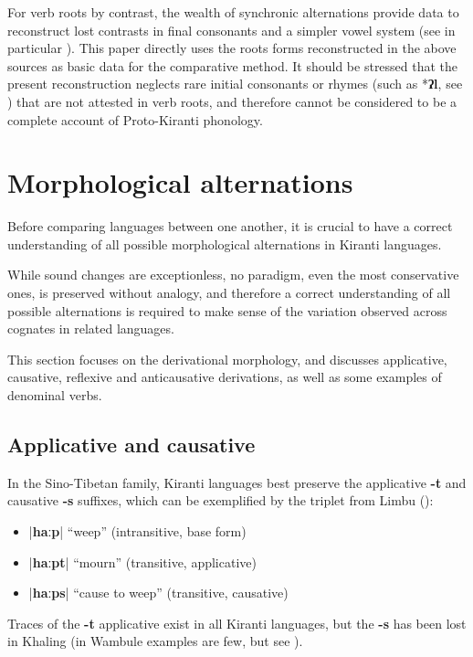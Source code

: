 \documentclass[oldfontcommands,oneside,a4paper,11pt]{article}
\newcommand{\ipa}[1]{\textbf{{\phon\mbox{#1}}}} %
\newcommand{\dhatu}[2]{|\ipa{#1}| ``#2''}
\begin{document}
For verb roots by contrast, the wealth of synchronic alternations provide data to reconstruct lost contrasts in final consonants and a simpler vowel system (see in particular \citealt{michailovsky02dico, jacques12khaling, michailovsky12dumi}). This paper directly uses the roots forms reconstructed in the above sources as basic data for the comparative method. It should be stressed that the present reconstruction neglects rare initial consonants or rhymes (such as *\ipa{ʔl}, see \citealt{opgenort04implosives}) that are not attested in verb roots, and therefore cannot be considered to be a complete account of Proto-Kiranti phonology.


\section{Morphological alternations} \label{sec:alternations}
Before comparing languages between one another, it is crucial to have a correct understanding of all possible morphological alternations in Kiranti languages. 

While sound changes are exceptionless, no paradigm, even the most conservative ones, is preserved without analogy, and therefore a correct understanding of all possible alternations is required to make sense of the variation observed across cognates in related languages.

This section focuses on the derivational morphology, and discusses applicative, causative, reflexive and anticausative derivations,  as well as some examples of denominal verbs.

\subsection{Applicative and causative} \label{sec:appl}
In the Sino-Tibetan family, Kiranti languages best preserve the applicative \ipa{-t} and causative \ipa{-s} suffixes, which can be exemplified by the triplet from Limbu (\citealt{michailovsky85dental}):

\begin{itemize}
\item  \dhatu{haːp}{weep} (intransitive, base form)
\item  \dhatu{haːpt}{mourn} (transitive, applicative)
\item  \dhatu{haːps}{cause to weep} (transitive, causative)
\end{itemize}

Traces of the \ipa{-t} applicative exist in all Kiranti languages, but the \ipa{-s} has been lost in Khaling (in Wambule examples are few, but see \citealt[270-1]{opgenort04wambule}).
\end{document}
